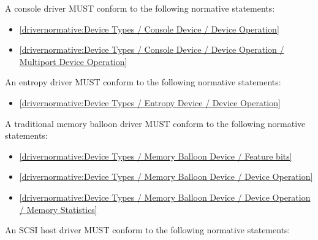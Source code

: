 A console driver MUST conform to the following normative statements:

\begin{itemize}
\item \ref{drivernormative:Device Types / Console Device / Device Operation}
\item \ref{drivernormative:Device Types / Console Device / Device Operation / Multiport Device Operation}
\end{itemize}

\label{sec:Conformance / Driver Conformance / Entropy Driver Conformance}

An entropy driver MUST conform to the following normative statements:

\begin{itemize}
\item \ref{drivernormative:Device Types / Entropy Device / Device Operation}
\end{itemize}

\label{sec:Conformance / Driver Conformance / Traditional Memory Balloon Driver Conformance}

A traditional memory balloon driver MUST conform to the following normative statements:

\begin{itemize}
\item \ref{drivernormative:Device Types / Memory Balloon Device / Feature bits}
\item \ref{drivernormative:Device Types / Memory Balloon Device / Device Operation}
\item \ref{drivernormative:Device Types / Memory Balloon Device / Device Operation / Memory Statistics}
\end{itemize}

\label{sec:Conformance / Driver Conformance / SCSI Host Driver Conformance}

An SCSI host driver MUST conform to the following normative statements:

